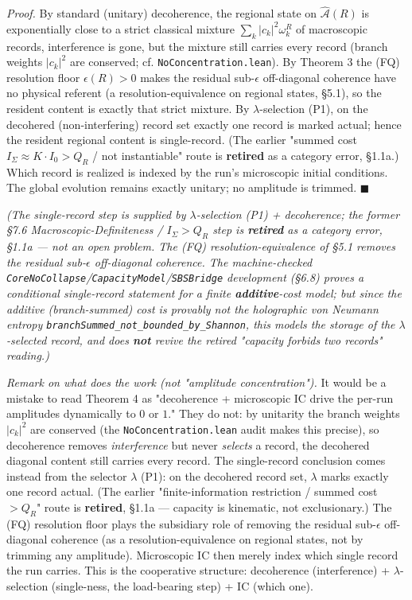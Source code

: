 \documentclass[11pt,a4paper]{article}
\begin{document}
\emph{Proof.} By standard (unitary) decoherence, the regional state on $\hat{\mathcal{A}}(R)$ is exponentially close to a strict classical mixture $\sum_k |c_k|^2 \omega_k^R$ of macroscopic records, interference is gone, but the mixture still carries every record (branch weights $|c_k|^2$ are conserved; cf. \texttt{NoConcentration.lean}). By Theorem 3 the (FQ) resolution floor $\epsilon(R) > 0$ makes the residual sub-$\epsilon$ off-diagonal coherence have no physical referent (a resolution-equivalence on regional states, §5.1), so the resident content is exactly that strict mixture. By $\lambda$-selection (P1), on the decohered (non-interfering) record set exactly one record is marked actual; hence the resident regional content is single-record. (The earlier "summed cost $I_\Sigma \approx K\cdot I_0 > Q_R$ / not instantiable" route is \textbf{retired} as a category error, §1.1a.) Which record is realized is indexed by the run's microscopic initial conditions. The global evolution remains exactly unitary; no amplitude is trimmed. $\blacksquare$

\emph{(The single-record step is supplied by $\lambda$-selection (P1) + decoherence; the former §7.6 Macroscopic-Definiteness / $I_\Sigma > Q_R$ step is \textbf{retired} as a category error, §1.1a — not an open problem. The (FQ) resolution-equivalence of §5.1 removes the residual sub-$\epsilon$ off-diagonal coherence. The machine-checked \texttt{CoreNoCollapse}/\texttt{CapacityModel}/\texttt{SBSBridge} development (§6.8) proves a conditional single-record statement for a finite \textbf{additive}-cost model; but since the additive (branch-summed) cost is provably not the holographic von Neumann entropy \texttt{branchSummed\_not\_bounded\_by\_Shannon}, this models the storage of the $\lambda$-selected record, and does \textbf{not} revive the retired "capacity forbids two records" reading.)}

\emph{Remark on what does the work (not "amplitude concentration").} It would be a mistake to read Theorem 4 as "decoherence + microscopic IC drive the per-run amplitudes dynamically to $0$ or $1$." They do not: by unitarity the branch weights $|c_k|^2$ are conserved (the \texttt{NoConcentration.lean} audit makes this precise), so decoherence removes \emph{interference} but never \emph{selects} a record, the decohered diagonal content still carries every record. The single-record conclusion comes instead from the selector $\lambda$ (P1): on the decohered record set, $\lambda$ marks exactly one record actual. (The earlier "finite-information restriction / summed cost $> Q_R$" route is \textbf{retired}, §1.1a — capacity is kinematic, not exclusionary.) The (FQ) resolution floor plays the subsidiary role of removing the residual sub-$\epsilon$ off-diagonal coherence (as a resolution-equivalence on regional states, not by trimming any amplitude). Microscopic IC then merely index which single record the run carries. This is the cooperative structure: decoherence (interference) + $\lambda$-selection (single-ness, the load-bearing step) + IC (which one).
\end{document}
